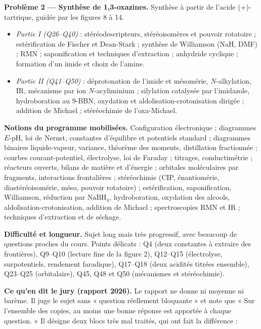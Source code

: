 \documentclass[11pt,a4paper]{article}
\providecommand{\tightlist}{\setlength{\itemsep}{0pt}\setlength{\parskip}{0pt}}
\begin{document}
\textbf{Problème 2 --- Synthèse de 1,3-oxazines.} Synthèse à partir de l'acide (+)-tartrique, guidée par les figures 8 à 14.

\begin{itemize}
\tightlist
\item
  \emph{Partie I (Q26--Q40)} : stéréodescripteurs, stéréoisomères et pouvoir rotatoire ; estérification de Fischer et Dean-Stark ; synthèse de Williamson (NaH, DMF) ; RMN ; saponification et techniques d'extraction ; anhydride cyclique ; formation d'un imide et choix de l'amine.
\item
  \emph{Partie II (Q41--Q50)} : déprotonation de l'imide et mésomérie, \(N\)-alkylation, IR, mécanisme par ion \(N\)-acyliminium ; silylation catalysée par l'imidazole, hydroboration au 9-BBN, oxydation et aldolisation-\allowbreak{}crotonisation dirigée ; addition de Michael ; stéréochimie de l'oxa-Michael.
\end{itemize}

\textbf{Notions du programme mobilisées.} Configuration électronique ; diagrammes \(E\)-pH, loi de Nernst, constantes d'équilibre et potentiels standard ; diagrammes binaires liquide-vapeur, variance, théorème des moments, distillation fractionnée ; courbes courant-potentiel, électrolyse, loi de Faraday ; titrages, conductimétrie ; réacteurs ouverts, bilans de matière et d'énergie ; orbitales moléculaires par fragments, interactions frontalières ; stéréochimie (CIP, énantiomérie, diastéréoisomérie, méso, pouvoir rotatoire) ; estérification, saponification, Williamson, réduction par \(\mathrm{NaBH_4}\), hydroboration, oxydation des alcools, aldolisation-\allowbreak{}crotonisation, addition de Michael ; spectroscopies RMN et IR ; techniques d'extraction et de séchage.

\textbf{Difficulté et longueur.} Sujet long mais très progressif, avec beaucoup de questions proches du cours. Points délicats : Q4 (deux constantes à extraire des frontières), Q9--Q10 (lecture fine de la figure 2), Q12--Q15 (électrolyse, surpotentiels, rendement faradique), Q17--Q18 (deux acidités titrées ensemble), Q23--Q25 (orbitalaire), Q45, Q48 et Q50 (mécanismes et stéréochimie).

\textbf{Ce qu'en dit le jury (rapport 2026).} Le rapport ne donne ni moyenne ni barème. Il juge le sujet sans « question réellement bloquante » et note que « Sur l'ensemble des copies, au moins une bonne réponse est apportée à chaque question. » Il désigne deux blocs très mal traités, qui ont fait la différence :
\end{document}
